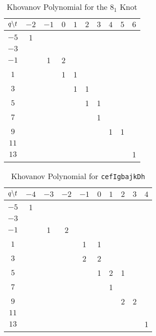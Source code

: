 \documentclass{article}
\theoremstyle{plain}
\begin{document}
        \begin{table}[H]
            \centering
            \begin{tabular}{| c | c | c | c | c | c | c | c | c | c |}
                \hline
                $q\symbol{92}t$&$-2$&$-1$&$0$&$1$&$2$&$3$&$4$&$5$&$6$\\
                \hline
                $-5$&1&&&&&&&&\\
                \hline
                $-3$&&&&&&&&&\\
                \hline
                $-1$&&1&2&&&&&&\\
                \hline
                $1$&&&1&1&&&&&\\
                \hline
                $3$&&&&1&1&&&&\\
                \hline
                $5$&&&&&1&1&&&\\
                \hline
                $7$&&&&&&1&&&\\
                \hline
                $9$&&&&&&&1&1&\\
                \hline
                $11$&&&&&&&&&\\
                \hline
                $13$&&&&&&&&&1\\
                \hline
            \end{tabular}
            \caption{Khovanov Polynomial for the $8_{1}$ Knot}
            \label{table:m_6_kho}
        \end{table}
        \begin{table}[H]
            \centering
            \begin{tabular}{| c | c | c | c | c | c | c | c | c | c |}
                \hline
                $q\symbol{92}t$&$-4$&$-3$&$-2$&$-1$&$0$&$1$&$2$&$3$&$4$\\
                \hline
                $-5$&1&&&&&&&&\\
                \hline
                $-3$&&&&&&&&&\\
                \hline
                $-1$&&1&2&&&&&&\\
                \hline
                $1$&&&&1&1&&&&\\
                \hline
                $3$&&&&2&2&&&&\\
                \hline
                $5$&&&&&1&2&1&&\\
                \hline
                $7$&&&&&&1&&&\\
                \hline
                $9$&&&&&&&2&2&\\
                \hline
                $11$&&&&&&&&&\\
                \hline
                $13$&&&&&&&&&1\\
                \hline
            \end{tabular}
            \caption{Khovanov Polynomial for \texttt{cefIgbajkDh}}
            \label{table:cefIgbajkDh_kho}
        \end{table}
\end{document}
